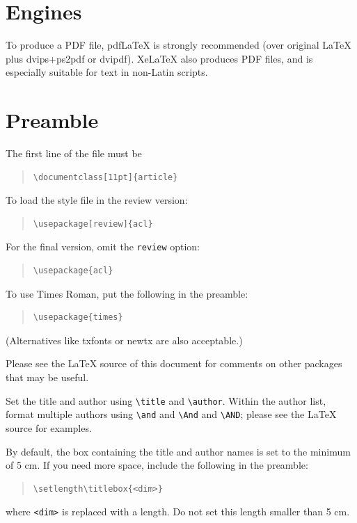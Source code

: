 \documentclass[11pt]{article}
\begin{document}
\section{Engines}

To produce a PDF file, pdf\LaTeX{} is strongly recommended (over original \LaTeX{} plus dvips+ps2pdf or dvipdf). Xe\LaTeX{} also produces PDF files, and is especially suitable for text in non-Latin scripts.

\section{Preamble}

The first line of the file must be
\begin{quote}
\begin{verbatim}
\documentclass[11pt]{article}
\end{verbatim}
\end{quote}

To load the style file in the review version:
\begin{quote}
\begin{verbatim}
\usepackage[review]{acl}
\end{verbatim}
\end{quote}
For the final version, omit the \verb|review| option:
\begin{quote}
\begin{verbatim}
\usepackage{acl}
\end{verbatim}
\end{quote}

To use Times Roman, put the following in the preamble:
\begin{quote}
\begin{verbatim}
\usepackage{times}
\end{verbatim}
\end{quote}
(Alternatives like txfonts or newtx are also acceptable.)

Please see the \LaTeX{} source of this document for comments on other packages that may be useful.

Set the title and author using \verb|\title| and \verb|\author|. Within the author list, format multiple authors using \verb|\and| and \verb|\And| and \verb|\AND|; please see the \LaTeX{} source for examples.

By default, the box containing the title and author names is set to the minimum of 5 cm. If you need more space, include the following in the preamble:
\begin{quote}
\begin{verbatim}
\setlength\titlebox{<dim>}
\end{verbatim}
\end{quote}
where \verb|<dim>| is replaced with a length. Do not set this length smaller than 5 cm.
\end{document}
